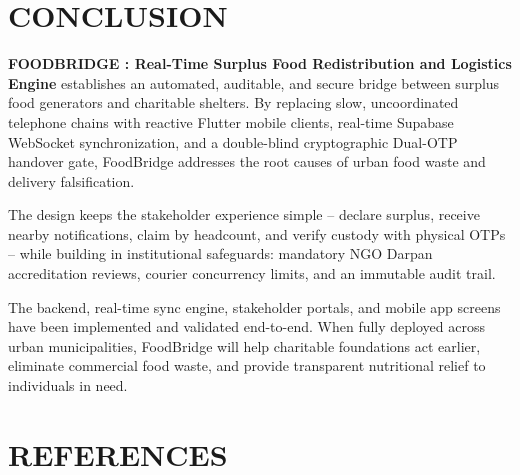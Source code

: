 \documentclass[12pt,a4paper]{article}
\begin{document}
\section{CONCLUSION}

\textbf{FOODBRIDGE : Real-Time Surplus Food Redistribution and Logistics Engine} establishes an automated, auditable, and secure bridge between surplus food generators and charitable shelters. By replacing slow, uncoordinated telephone chains with reactive Flutter mobile clients, real-time Supabase WebSocket synchronization, and a double-blind cryptographic Dual-OTP handover gate, FoodBridge addresses the root causes of urban food waste and delivery falsification.

The design keeps the stakeholder experience simple -- declare surplus, receive nearby notifications, claim by headcount, and verify custody with physical OTPs -- while building in institutional safeguards: mandatory NGO Darpan accreditation reviews, courier concurrency limits, and an immutable audit trail.

The backend, real-time sync engine, stakeholder portals, and mobile app screens have been implemented and validated end-to-end. When fully deployed across urban municipalities, FoodBridge will help charitable foundations act earlier, eliminate commercial food waste, and provide transparent nutritional relief to individuals in need.

\newpage
\section*{REFERENCES}
\end{document}
